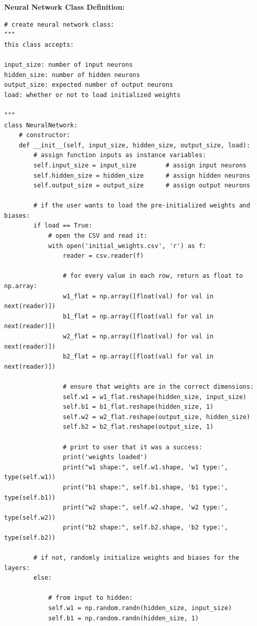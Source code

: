 \documentclass[a4paper]{article}
\begin{document}
\textbf{Neural Network Class Definition:}

\begin{lstlisting}[basicstyle= \scriptsize]
# create neural network class:
"""
this class accepts:

input_size: number of input neurons
hidden_size: number of hidden neurons
output_size: expected number of output neurons
load: whether or not to load initialized weights

"""
class NeuralNetwork:
    # constructor:
    def __init__(self, input_size, hidden_size, output_size, load):
        # assign function inputs as instance variables:
        self.input_size = input_size        # assign input neurons
        self.hidden_size = hidden_size      # assign hidden neurons
        self.output_size = output_size      # assign output neurons

        # if the user wants to load the pre-initialized weights and biases:
        if load == True:
            # open the CSV and read it:
            with open('initial_weights.csv', 'r') as f:
                reader = csv.reader(f)

                # for every value in each row, return as float to np.array:
                w1_flat = np.array([float(val) for val in next(reader)])
                b1_flat = np.array([float(val) for val in next(reader)])
                w2_flat = np.array([float(val) for val in next(reader)])
                b2_flat = np.array([float(val) for val in next(reader)])

                # ensure that weights are in the correct dimensions:
                self.w1 = w1_flat.reshape(hidden_size, input_size)
                self.b1 = b1_flat.reshape(hidden_size, 1)
                self.w2 = w2_flat.reshape(output_size, hidden_size)
                self.b2 = b2_flat.reshape(output_size, 1)

                # print to user that it was a success:
                print('weights loaded')
                print("w1 shape:", self.w1.shape, 'w1 type:', type(self.w1))
                print("b1 shape:", self.b1.shape, 'b1 type:', type(self.b1))
                print("w2 shape:", self.w2.shape, 'w2 type:', type(self.w2))
                print("b2 shape:", self.b2.shape, 'b2 type:', type(self.b2))

        # if not, randomly initialize weights and biases for the layers:
        else:

            # from input to hidden:
            self.w1 = np.random.randn(hidden_size, input_size)
            self.b1 = np.random.randn(hidden_size, 1)


\end{lstlisting}
\end{document}
